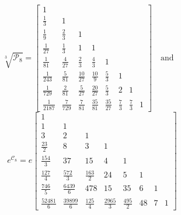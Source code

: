 \begin{displaymath}
    \sqrt[3]{\mathcal{P}_{8}}= \left[\begin{matrix}1 &  &  &  &  &  &  & \\\frac{1}{3} & 1 &  &  &  &  &  & \\\frac{1}{9} & \frac{2}{3} & 1 &  &  &  &  & \\\frac{1}{27} & \frac{1}{3} & 1 & 1 &  &  &  & \\\frac{1}{81} & \frac{4}{27} & \frac{2}{3} & \frac{4}{3} & 1 &  &  & \\\frac{1}{243} & \frac{5}{81} & \frac{10}{27} & \frac{10}{9} & \frac{5}{3} & 1 &  & \\\frac{1}{729} & \frac{2}{81} & \frac{5}{27} & \frac{20}{27} & \frac{5}{3} & 2 & 1 & \\\frac{1}{2187} & \frac{7}{729} & \frac{7}{81} & \frac{35}{81} & \frac{35}{27} & \frac{7}{3} & \frac{7}{3} & 1\end{matrix}\right]
    \quad\text{and}\quad
\end{displaymath}
\begin{displaymath}
    e^{\mathcal{C}_{8}} = e \left[\begin{matrix}1 &   &   &   &   &   &   &  \\1 & 1 &   &   &   &   &   &  \\3 & 2 & 1 &   &   &   &   &  \\\frac{23}{2} & 8 & 3 & 1 &   &   &   &  \\\frac{154}{3} & 37 & 15 & 4 & 1 &   &   &  \\\frac{1 27}{4} & \frac{572}{3} & \frac{163}{2} & 24 & 5 & 1 &   &  \\\frac{7 46}{5} & \frac{6439}{6} & 478 & 15  & 35 & 6 & 1 &  \\\frac{5 2481}{6 } & \frac{39 899}{6 } & \frac{12  5}{4} & \frac{2965}{3} & \frac{495}{2} & 48 & 7 & 1\end{matrix}\right]
\end{displaymath}
